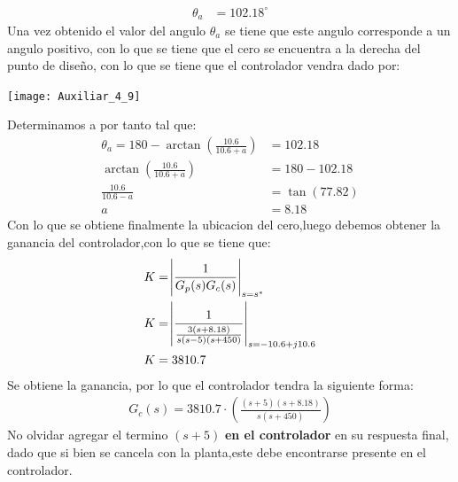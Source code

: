 \documentclass[
  11pt,
  letterpaper,
   addpoints,
   answers
  ]{exam}
\begin{document}
\begin{questions}
\begin{solution}
\begin{align}
    \theta_{a} &= 102.18^{\circ}
\end{align}
Una vez obtenido el valor del angulo $\theta_{a}$ se tiene que este angulo corresponde a un angulo positivo, con lo que se tiene que el cero se encuentra a la derecha del punto de diseño, con lo que se tiene que el controlador vendra dado por:
\begin{center}
    \texttt{[image: Auxiliar\_4\_9]}
\end{center}
Determinamos a por tanto tal que:
\begin{align}
    \theta_{a} = 180 - \arctan(\frac{10.6}{10.6+a}) &= 102.18\\
    \arctan(\frac{10.6}{10.6+a}) &= 180 - 102.18\\
    \frac{10.6}{10.6-a} &= \tan(77.82)\\
    a &= 8.18
\end{align}
Con lo que se obtiene finalmente la ubicacion del cero,luego debemos obtener la ganancia del controlador,con lo que se tiene que:
\begin{align}
    K &= \abs{\frac{1}{G_{p}(s)G_{c}(s)}}_{s=s^{*}}\\
    K &= \abs{\frac{1}{\frac{3(s+8.18)}{s(s-5)(s+450)}}}_{s=-10.6+j10.6}\\
    K &= 3810.7
\end{align}
Se obtiene la ganancia, por lo que el controlador tendra la siguiente forma:
\begin{align}
    G_{c}(s) = 3810.7\cdot \left(\frac{(s+5)(s+8.18)}{s(s+450)}\right)
\end{align}
No olvidar agregar el termino $(s+5)$ \textbf{en el controlador} en su respuesta final, dado que si bien se cancela con la planta,este debe encontrarse presente en el controlador.

\end{solution}
\end{questions}
\end{document}

